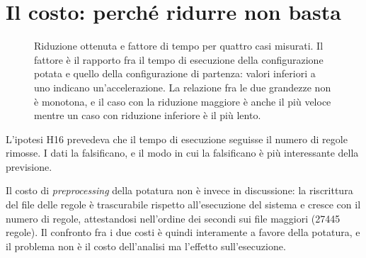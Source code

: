 \section{Il costo: perché ridurre non basta}\label{sec:res-cost}\label{sec:score-argmin}

\begin{figure}[htbp]
\centering
{}
\caption{Riduzione ottenuta e fattore di tempo per quattro casi misurati. Il fattore è il rapporto
fra il tempo di esecuzione della configurazione potata e quello della configurazione di partenza:
valori inferiori a uno indicano un'accelerazione. La relazione fra le due grandezze non è
monotona, e il caso con la riduzione maggiore è anche il più veloce mentre un caso con riduzione
inferiore è il più lento.}
\label{fig:time}
\end{figure}

L'ipotesi H16 prevedeva che il tempo di esecuzione seguisse il numero di regole rimosse. I dati la
falsificano, e il modo in cui la falsificano è più interessante della previsione.

Il costo di \emph{preprocessing} della potatura non è invece in discussione: la riscrittura del
file delle regole è trascurabile rispetto all'esecuzione del sistema e cresce con il numero di
regole, attestandosi nell'ordine dei secondi sui file maggiori (\num{27445} regole). Il confronto
fra i due costi è quindi interamente a favore della potatura, e il problema non è il costo
dell'analisi ma l'effetto sull'esecuzione.

